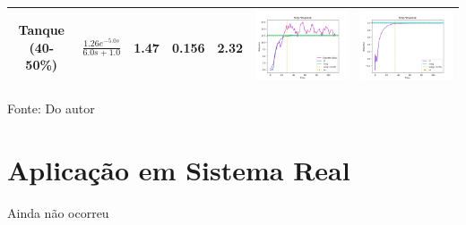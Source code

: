 \begin{table}[!htbp]
\begin{tabular}{|c|c|c|c|c|c|c|}
\hline
Tanque (40-50\%) & $\frac{1.26 e^{-5.0s}}{6.0s + 1.0}$ & 1.47 & 0.156 & 2.32 & \includegraphics[width=0.2\linewidth]{figuras/tanque_70_80} & \includegraphics[width=0.2\linewidth]{figuras/tanque_70_80c} \\
\hline
\end{tabular}
\label{tab:results_tanque}
\vspace{0cm}\hspace{0cm}\small{Fonte: Do autor}
\end{table}




\section{Aplicação em Sistema Real}

Ainda não ocorreu
